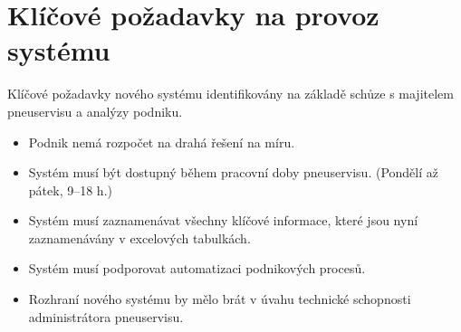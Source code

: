 \section{Klíčové požadavky na provoz systému}
Klíčové požadavky nového systému identifikovány na základě schůze s majitelem pneuservisu a analýzy podniku.
\begin{itemize}
    \item Podnik nemá rozpočet na drahá řešení na míru.
    \item Systém musí být dostupný během pracovní doby pneuservisu. (Pondělí až pátek, 9--18 h.)
    \item Systém musí zaznamenávat všechny klíčové informace, které jsou nyní zaznamenávány v excelových tabulkách.
    \item Systém musí podporovat automatizaci podnikových procesů.
    \item Rozhraní nového systému by mělo brát v úvahu technické schopnosti administrátora pneuservisu.
\end{itemize}
